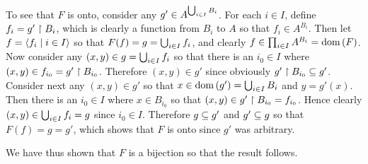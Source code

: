 {{    To see that $F$ is onto, consider any $g' \in A^{\uni B_i}$.
    For each $i \in I$, define $f_i = g' \rest B_i$, which is clearly a function from $B_i$ to $A$ so that $f_i \in A^{B_i}$.
    Then let $f = \angles{f_i \where i \in I}$ so that $F(f) = g = \uni f_i$, and clearly $f \in \prodi A^{B_i} = \dom(F)$.
    Now consider any $(x,y) \in g = \uni f_i$ so that there is an $i_0 \in I$ where $(x,y) \in f_{i_0} = g' \rest B_{i_0}$.
    Therefore $(x,y) \in g'$ since obviously $g' \rest B_{i_0} \ss g'$.
    Consider next any $(x,y) \in g'$ so that $x \in \dom(g') = \uni B_i$ and $y = g'(x)$.
    Then there is an $i_0 \in I$ where $x \in B_{i_0}$ so that $(x,y) \in g' \rest B_{i_0} = f_{i_0}$.
    Hence clearly $(x,y) \in \uni f_i = g$ since $i_0 \in I$.
    Therefore $g \ss g'$ and $g' \ss g$ so that $F(f) = g = g'$, which shows that $F$ is onto since $g'$ was arbitrary.

    We have thus shown that $F$ is a bijection so that the result follows.
  }
}

